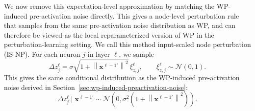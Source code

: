 We now remove this expectation-level approximation by matching the WP-induced pre-activation noise directly. This gives a node-level perturbation rule that samples from the same pre-activation noise distribution as WP, and can therefore be viewed as the local reparameterized version of WP in the perturbation-learning setting. We call this method input-scaled node perturbation (IS-NP).
For each neuron $j$ in layer $\ell$, we sample
\begin{equation}
\Delta z^\ell_j
=
\sigma \sqrt{1+\left\|\mathbf{x}^{\ell-1\prime}\right\|^2}\, \xi^\ell_{z,j},
\qquad
\xi^\ell_{z,j} \sim \mathcal{N}(0,1).
\end{equation}
This gives the same conditional distribution as the WP-induced pre-activation noise derived in Section~\ref{sec:wp-induced-preactivation-noise}:
\begin{equation}
\Delta z^\ell_j \mid \mathbf{x}^{\ell-1\prime}
\sim
\mathcal{N}\!\left(0, \sigma^2 \left(1+\left\|\mathbf{x}^{\ell-1\prime}\right\|^2\right)\right).
\end{equation}

